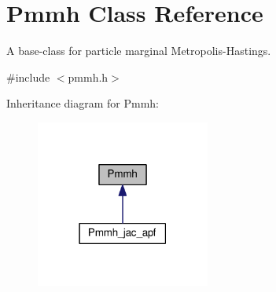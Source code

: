 \hypertarget{classPmmh}{}\section{Pmmh Class Reference}
\label{classPmmh}


A base-\/class for particle marginal Metropolis-\/\+Hastings.  




{\ttfamily \#include $<$pmmh.\+h$>$}



Inheritance diagram for Pmmh\+:\nopagebreak
\begin{figure}[H]
\begin{center}
\leavevmode
\includegraphics[width=162pt]{classPmmh__inherit__graph}
\end{center}
\end{figure}

